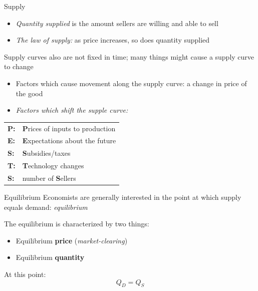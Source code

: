 \documentclass[compress]{beamer}
\begin{document}
  \begin{frame}{Supply}
    \begin{itemize}
        \item \textit{Quantity supplied} is the amount sellers are willing and able to sell
        \item \textit{The law of supply:} as price increases, so does quantity supplied
\end{itemize}
 
 \begin{block}{Supply curves also are not fixed in time; many things might cause a supply curve to change} 
        \begin{itemize}
        \item Factors which cause movement along the supply curve: a change in price of the good
        \item \textit{Factors which shift the supple curve:} 
        \end{itemize}
    \begin{center}
\begin{tabular}{ll}
\textbf{P:} & \textbf{P}rices of inputs to production \\
\textbf{E:} & \textbf{E}xpectations about the future \\
\textbf{S:}& \textbf{S}ubsidies/taxes \\
\textbf{T:} & \textbf{T}echnology changes \\
\textbf{S:}& number of \textbf{S}ellers \\
\end{tabular}
\end{center}
\end{block}
        \end{frame}



 \begin{frame}{Equilibrium}
    Economists are generally interested in the point at which supply equals demand: \textit{equilibrium}
    
    \begin{block}{The equilibrium is characterized by two things:}
    \begin{itemize}
        \item Equilibrium \textbf{price} (\textit{market-clearing})
        \item Equilibrium \textbf{quantity}
    \end{itemize}
    \end{block}
    \medskip

    At this point:
    $$
    Q_D = Q_S
    $$
\end{frame}
\end{document}
